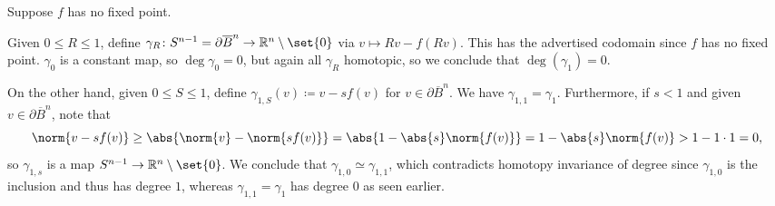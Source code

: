 Suppose $f$ has no fixed point.

Given $0\leq R\leq 1$, define $\gamma_R\colon S^{n-1} = \partial\overline{B}^n\to \mathbb{R}^n\setminus\set{0}$
via $v\mapsto Rv - f(Rv)$. This has the advertised codomain since $f$ has no fixed point.
$\gamma_0$ is a constant map, so $\deg\gamma_0=0$, but again all $\gamma_R$ homotopic,
so we conclude that $\deg(\gamma_1)=0$.

On the other hand, given $0\leq S\leq 1$, define $\gamma_{1, S}(v)\coloneqq v-sf(v)$
for $v \in \partial \overline{B}^n$.  We have $\gamma_{1, 1} = \gamma_1$.
Furthermore, if $s < 1$ and given $v \in \partial\overline{B}^n$, note that
\[ \norm{v - sf(v)} \geq \abs{\norm{v} - \norm{sf(v)}} = \abs{1 - \abs{s}\norm{f(v)}} = 1 - \abs{s}\norm{f(v)} > 1 - 1 \cdot 1 = 0,  \]
so $\gamma_{1, s}$ is a map $S^{n-1}\to \mathbb{R}^n\setminus\set{0}$. We conclude
that $\gamma_{1, 0} \simeq \gamma_{1, 1}$, which contradicts homotopy invariance of
degree since $\gamma_{1, 0}$ is the inclusion and thus has degree $1$, whereas
$\gamma_{1, 1} = \gamma_1$ has degree $0$ as seen earlier.
